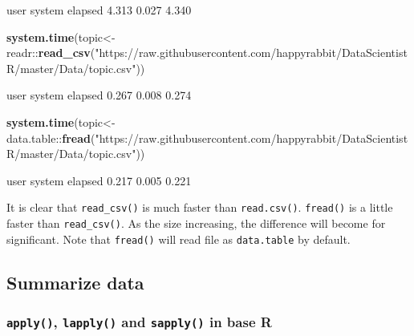 \documentclass[12pt,]{krantz}
\newenvironment{Shaded}{\begin{snugshade}}{\end{snugshade}}
\newcommand{\KeywordTok}[1]{\textcolor[rgb]{0.13,0.29,0.53}{\textbf{{#1}}}}
\newcommand{\StringTok}[1]{\textcolor[rgb]{0.31,0.60,0.02}{{#1}}}
\newcommand{\NormalTok}[1]{{#1}}
\theoremstyle{definition}
\theoremstyle{definition}
\theoremstyle{remark}
\begin{document}
\begin{Shaded}
\begin{Highlighting}[]
  \NormalTok{user  system elapsed }
  \NormalTok{4.313   0.027   4.340}
\end{Highlighting}
\end{Shaded}

\begin{Shaded}
\begin{Highlighting}[]
\KeywordTok{system.time}\NormalTok{(topic<-readr::}\KeywordTok{read_csv}\NormalTok{(}\StringTok{"https://raw.githubusercontent.com/happyrabbit/DataScientistR/master/Data/topic.csv"}\NormalTok{))}
\end{Highlighting}
\end{Shaded}

\begin{Shaded}
\begin{Highlighting}[]
   \NormalTok{user  system elapsed }
  \NormalTok{0.267   0.008   0.274 }
\end{Highlighting}
\end{Shaded}

\begin{Shaded}
\begin{Highlighting}[]
\KeywordTok{system.time}\NormalTok{(topic<-data.table::}\KeywordTok{fread}\NormalTok{(}\StringTok{"https://raw.githubusercontent.com/happyrabbit/DataScientistR/master/Data/topic.csv"}\NormalTok{))}
\end{Highlighting}
\end{Shaded}

\begin{Shaded}
\begin{Highlighting}[]
   \NormalTok{user  system elapsed }
  \NormalTok{0.217   0.005   0.221 }
\end{Highlighting}
\end{Shaded}

It is clear that \texttt{read\_csv()} is much faster than
\texttt{read.csv()}. \texttt{fread()} is a little faster than
\texttt{read\_csv()}. As the size increasing, the difference will become
for significant. Note that \texttt{fread()} will read file as
\texttt{data.table} by default.

\subsection{Summarize data}\label{summarize-data}

\subsubsection{\texorpdfstring{\texttt{apply()}, \texttt{lapply()} and
\texttt{sapply()} in base
R}{apply(), lapply() and sapply() in base R}}\label{apply-lapply-and-sapply-in-base-r}
\end{document}

